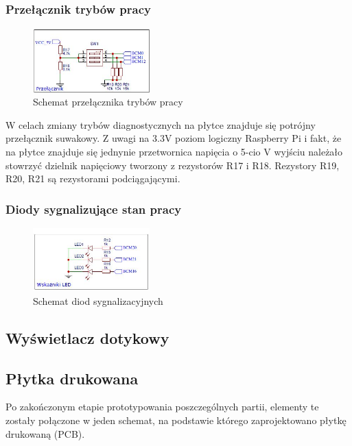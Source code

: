 \documentclass[12pt, eng, twoside, openany, final]{mgr}
\begin{document}
        \subsubsection{Przełącznik trybów pracy}
            \begin{figure}[H]
            \begin{center}
                \includegraphics[width=0.4\textwidth]{przelacznik.jpg}
                \caption{Schemat przełącznika trybów pracy}
            \end{center}
            \end{figure}
        W celach zmiany trybów diagnostycznych na płytce znajduje się potrójny przełącznik suwakowy. Z uwagi na 3.3V poziom logiczny Raspberry Pi i fakt, że na płytce znajduje się jednynie przetwornica napięcia o 5-cio V wyjściu należało stowrzyć dzielnik napięciowy tworzony z rezystorów R17 i R18. Rezystory R19, R20, R21 są rezystorami podciągającymi.  
        \subsubsection{Diody sygnalizujące stan pracy}
            \begin{figure}[H]
            \begin{center}
                \includegraphics[width=0.4\textwidth]{wskaznik.jpg}
                \caption{Schemat diod sygnalizacyjnych} 
            \end{center}
            \end{figure}
            
        
        \subsection{Wyświetlacz dotykowy}
        
        \subsection{Płytka drukowana}
            Po zakończonym etapie prototypowania poszczególnych partii, elementy te zostały połączone w jeden schemat, na podstawie którego zaprojektowano płytkę drukowaną (PCB). 
\end{document}
